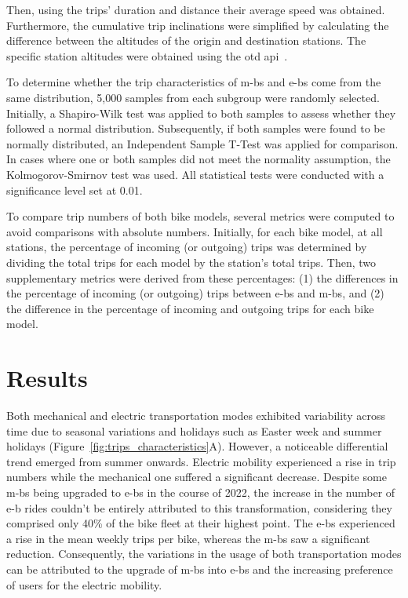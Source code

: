     Then, using the trips' duration and distance their average speed was obtained. Furthermore, the cumulative trip inclinations were simplified by calculating the difference between the altitudes of the origin and destination stations. The specific station altitudes were obtained using the \ac{otd} \ac{api}~\cite{OpenTopoData_2023}.

    To determine whether the trip characteristics of \acp{m-b} and \acp{e-b} come from the same distribution, 5,000 samples from each subgroup were randomly selected. Initially, a Shapiro-Wilk test was applied to both samples to assess whether they followed a normal distribution. Subsequently, if both samples were found to be normally distributed, an Independent Sample T-Test was applied for comparison. In cases where one or both samples did not meet the normality assumption, the Kolmogorov-Smirnov test was used. All statistical tests were conducted with a significance level set at 0.01.

    To compare trip numbers of both bike models, several metrics were computed to avoid comparisons with absolute numbers. Initially, for each bike model, at all stations, the percentage of incoming (or outgoing) trips was determined by dividing the total trips for each model by the station's total trips. Then, two supplementary metrics were derived from these percentages: (1) the differences in the percentage of incoming (or outgoing) trips between \acp{e-b} and \acp{m-b}, and (2) the difference in the percentage of incoming and outgoing trips for each bike model.


\section{Results}

Both mechanical and electric transportation modes exhibited variability across time due to seasonal variations and holidays such as Easter week and summer holidays (Figure~\ref{fig:trips_characteristics}A). However, a noticeable differential trend emerged from summer onwards. Electric mobility experienced a rise in trip numbers while the mechanical one suffered a significant decrease. Despite some \acp{m-b} being upgraded to \acp{e-b} in the course of 2022, the increase in the number of \ac{e-b} rides couldn't be entirely attributed to this transformation, considering they comprised only 40\% of the bike fleet at their highest point. The \acp{e-b} experienced a rise in the mean weekly trips per bike, whereas the \acp{m-b} saw a significant reduction. Consequently, the variations in the usage of both transportation modes can be attributed to the upgrade of \acp{m-b} into \acp{e-b} and the increasing preference of users for the electric mobility.

